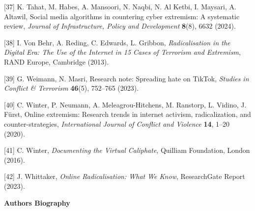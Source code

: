 \documentclass[11pt,a4paper]{article}
\begin{document}
	[37] K. Tahat, M. Habes, A. Mansoori, N. Naqbi, N. Al Ketbi, I. Maysari, A. Altawil, Social media algorithms in countering cyber extremism: A systematic review, \textit{Journal of Infrastructure, Policy and Development} \textbf{8}(8), 6632 (2024).
	
	[38] I. Von Behr, A. Reding, C. Edwards, L. Gribbon, \textit{Radicalisation in the Digital Era: The Use of the Internet in 15 Cases of Terrorism and Extremism}, RAND Europe, Cambridge (2013).
	
	[39] G. Weimann, N. Masri, Research note: Spreading hate on TikTok, \textit{Studies in Conflict \& Terrorism} \textbf{46}(5), 752--765 (2023).
	
	[40] C. Winter, P. Neumann, A. Meleagrou-Hitchens, M. Ranstorp, L. Vidino, J. Fürst, Online extremism: Research trends in internet activism, radicalization, and counter-strategies, \textit{International Journal of Conflict and Violence} \textbf{14}, 1--20 (2020).
	
	[41] C. Winter, \textit{Documenting the Virtual Caliphate}, Quilliam Foundation, London (2016).
	
	[42] J. Whittaker, \textit{Online Radicalisation: What We Know}, ResearchGate Report (2023).
	
	\textbf{Authors Biography}
	
\end{document}
